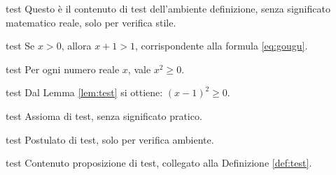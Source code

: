 \documentclass[it]{../../elegantbook}
\begin{document}
\ifdefined\simpleTest
\begin{definition}\label{def:test}
\else
\begin{definition}{test}
\fi
Questo è il contenuto di test dell'ambiente definizione, senza significato matematico reale, solo per verifica stile.
\end{definition}

\ifdefined\simpleTest
\begin{theorem}\label{thm:test}
\else
\begin{theorem}{test}
\fi
Se $x>0$, allora $x+1>1$, corrispondente alla formula \eqref{eq:gougu}.
\end{theorem}

\ifdefined\simpleTest
\begin{lemma}\label{lem:test}
\else
\begin{lemma}{test}
\fi
Per ogni numero reale $x$, vale $x^2\geq0$.
\end{lemma}

\ifdefined\simpleTest
\begin{corollary}\label{cor:test}
\else
\begin{corollary}{test}
\fi
Dal Lemma \ref{lem:test} si ottiene: $(x-1)^2\geq0$.
\end{corollary}

\ifdefined\simpleTest
\begin{axiom}\label{axi:test}
\else
\begin{axiom}{test}
\fi
Assioma di test, senza significato pratico.
\end{axiom}

\ifdefined\simpleTest
\begin{postulate}\label{pos:test}
\else
\begin{postulate}{test}
\fi
Postulato di test, solo per verifica ambiente.
\end{postulate}

\ifdefined\simpleTest
\begin{proposition}\label{pro:test}
\else
\begin{proposition}{test}
\fi
Contenuto proposizione di test, collegato alla Definizione \ref{def:test}.
\end{proposition}


\end{proposition}
\end{postulate}
\end{axiom}
\end{corollary}
\end{lemma}
\end{theorem}
\end{definition}
\end{document}
